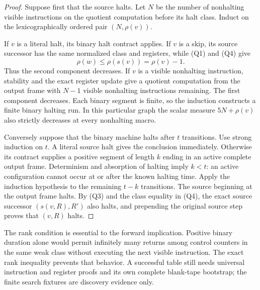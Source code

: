 \begin{proof}
Suppose first that the source halts. Let \(N\) be the number of nonhalting
visible instructions on the quotient computation before its halt class.
Induct on the lexicographically ordered pair \((N,\rho(v))\).

If \(v\) is a literal halt, its binary halt contract applies. If \(v\) is a
skip, its source successor has the same normalized class and registers,
while (Q1) and (Q4) give
\[
 \rho(w)\leq \rho(s(v))=\rho(v)-1.
\]
Thus the second component decreases. If \(v\) is a visible nonhalting
instruction, stability and the exact register update give a quotient
computation from the output frame with \(N-1\) visible nonhalting
instructions remaining. The first component decreases. Each binary
segment is finite, so the induction constructs a finite binary halting run.
In this particular graph the scalar measure \(5N+\rho(v)\) also strictly
decreases at every nonhalting macro.

Conversely suppose that the binary machine halts after \(t\) transitions.
Use strong induction on \(t\). A literal source halt gives the conclusion
immediately. Otherwise its contract supplies a positive segment of length
\(k\) ending in an active complete output frame. Determinism and absorption
of halting imply \(k<t\): an active configuration cannot occur at or after
the known halting time. Apply the induction hypothesis to the remaining
\(t-k\) transitions. The source beginning at the output frame halts.
By (Q3) and the class equality in (Q4), the exact source successor
\((s(v,R),R')\) also halts, and prepending the original source step proves
that \((v,R)\) halts.
\end{proof}

The rank condition is essential to the forward implication. Positive binary
duration alone would permit infinitely many returns among control counters
in the same weak class without executing the next visible instruction.
The exact rank inequality prevents that behavior. A successful table still
needs universal instruction and register proofs and its own complete
blank-tape bootstrap; the finite search fixtures are discovery evidence
only.

